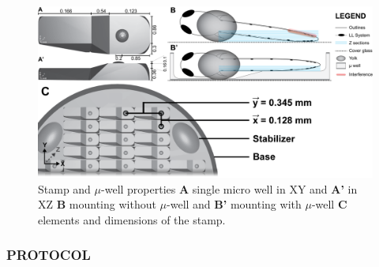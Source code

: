 \documentclass[11pt,singlespacinge,twoside]{reedthesis} %
\begin{document}
\begin{figure}

{\centering \includegraphics[width=0.6\linewidth]{figure/02-MaMo/Mount/mountmicro} 

}

\caption[Stamp and micro-well properties]{Stamp and \(\mu\)-well properties \textbf{A} single micro well in XY and \textbf{A'} in XZ \textbf{B} mounting without \(\mu\)-well and \textbf{B'} mounting with \(\mu\)-well \textbf{C} elements and dimensions of the stamp.}\label{fig:Mountmicro}
\end{figure}
\hypertarget{protocol}{%
\subsubsection{\texorpdfstring{\textbf{PROTOCOL}}{PROTOCOL}}\label{protocol}}
\end{document}
